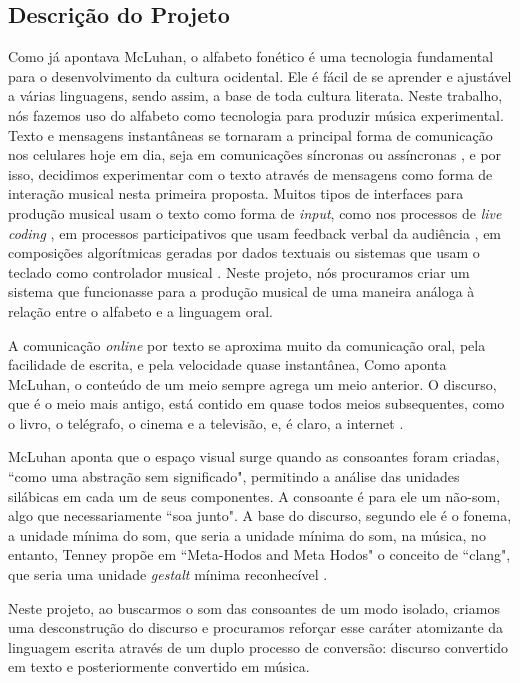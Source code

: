 \subsection{Descrição do Projeto}
Como já apontava McLuhan\cite{mcluhan1968comunicaccoes}, o alfabeto fonético é uma tecnologia fundamental para o desenvolvimento da cultura ocidental. Ele é fácil de se aprender e ajustável a várias linguagens, sendo assim, a base de toda cultura literata. Neste trabalho, nós fazemos uso do alfabeto como tecnologia para produzir música experimental. Texto e mensagens instantâneas se tornaram a principal forma de comunicação nos celulares hoje em dia, seja em comunicações síncronas ou assíncronas \cite{Madell:2007}, e por isso, decidimos experimentar com  o texto através de mensagens como forma de interação musical nesta primeira proposta. Muitos tipos de interfaces para produção musical usam o texto como forma de \emph{input}, como nos processos de \emph{live coding} \cite{Collins2003}, em processos participativos que usam feedback verbal da audiência \cite{noauthor_transglasphone_nodate}, em composições algorítmicas geradas por dados textuais ou sistemas que usam o teclado como controlador musical \cite{Fiebrink2007}. Neste projeto, nós procuramos criar um sistema que funcionasse para a produção musical de uma maneira análoga à relação entre o alfabeto e a linguagem oral.

A comunicação \emph{online} por texto se aproxima muito da comunicação oral, pela facilidade de escrita, e pela velocidade quase instantânea,\cite[33]{Levinson2001} Como aponta McLuhan, o conteúdo de um meio sempre agrega um meio anterior. O discurso, que é o meio mais antigo, está contido em quase todos meios subsequentes, como o livro, o telégrafo, o cinema e a televisão, e, é claro, a internet \cite[42]{Levinson2001}. 

McLuhan aponta que o espaço visual surge quando as consoantes foram criadas, ``como uma abstração sem significado", permitindo a análise das unidades silábicas em cada um de seus componentes. A consoante é para ele um não-som, algo que necessariamente ``soa junto". \cite[13-14]{mcluhan1968comunicaccoes} A base do discurso, segundo ele é o fonema, a unidade mínima do som, que seria a unidade mínima do som, na música, no entanto, Tenney  propõe em ``Meta-Hodos and Meta Hodos" o conceito de ``clang", que seria uma unidade \emph{gestalt} mínima reconhecível \cite[23]{Tenney1988}. 

Neste projeto, ao buscarmos o som das consoantes de um modo isolado, criamos uma desconstrução do discurso e procuramos reforçar esse caráter atomizante da linguagem escrita através de um duplo processo de conversão: discurso convertido em texto e posteriormente convertido em música.

